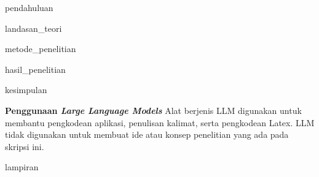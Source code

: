 \documentclass[oneside,12pt, a4paper]{book}
\numberwithin{equation}{chapter}
\begin{document}

\setcounter{tocdepth}{2}
\renewcommand{\thechapter}{\Roman{chapter}} %
\clearpage
\tableofcontents

\setcounter{tocdepth}{2}
\renewcommand{\thechapter}{\arabic{chapter}} %
\clearpage
\listoffigures

\clearpage
\listoftables


\clearpage
{}
\setcounter{tocdepth}{1}

\renewcommand{\thechapter}{\Roman{chapter}} %



\mainmatter
\justifying

\begin{doublespace}


\clearpage
{pendahuluan}

\clearpage
{landasan_teori}

\clearpage
{metode_penelitian}

\clearpage
{hasil_penelitian}

\clearpage
{kesimpulan}


%
%
%
%
%
%


\end{doublespace}

\backmatter
\clearpage
\printbibliography[
heading=bibintoc, 
title=DAFTAR PUSTAKA]

\clearpage
\textbf{Penggunaan \textit{Large Language Models}} Alat berjenis LLM digunakan untuk membantu pengkodean
aplikasi, penulisan kalimat, serta pengkodean Latex.
LLM tidak digunakan untuk membuat ide atau konsep penelitian yang ada pada skripsi ini.

\appendix
\clearpage
{lampiran}

\clearpage
\end{document}
